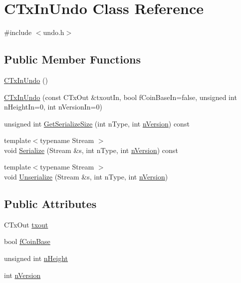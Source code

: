 \hypertarget{class_c_tx_in_undo}{}\section{C\+Tx\+In\+Undo Class Reference}
\label{class_c_tx_in_undo}


{\ttfamily \#include $<$undo.\+h$>$}

\subsection*{Public Member Functions}
\begin{DoxyCompactItemize}
\item 
\hyperlink{class_c_tx_in_undo_a9f8d4a16f1cb14fcec729becdb944003}{C\+Tx\+In\+Undo} ()
\item 
\hyperlink{class_c_tx_in_undo_a9f4da076d789bf5fa3f6d8d4b1d7d6fd}{C\+Tx\+In\+Undo} (const C\+Tx\+Out \&txout\+In, bool f\+Coin\+Base\+In=false, unsigned int n\+Height\+In=0, int n\+Version\+In=0)
\item 
unsigned int \hyperlink{class_c_tx_in_undo_a6f992d64f9d4ee6299cbd3305e4fd90f}{Get\+Serialize\+Size} (int n\+Type, int \hyperlink{class_c_tx_in_undo_a193281289475ca792e436a7a02de23ef}{n\+Version}) const 
\item 
{\footnotesize template$<$typename Stream $>$ }\\void \hyperlink{class_c_tx_in_undo_a37cebff3e836226b36e51d91e7cc2739}{Serialize} (Stream \&s, int n\+Type, int \hyperlink{class_c_tx_in_undo_a193281289475ca792e436a7a02de23ef}{n\+Version}) const 
\item 
{\footnotesize template$<$typename Stream $>$ }\\void \hyperlink{class_c_tx_in_undo_a0a2b82f03edad7ad85a66e63e4552af9}{Unserialize} (Stream \&s, int n\+Type, int \hyperlink{class_c_tx_in_undo_a193281289475ca792e436a7a02de23ef}{n\+Version})
\end{DoxyCompactItemize}
\subsection*{Public Attributes}
\begin{DoxyCompactItemize}
\item 
C\+Tx\+Out \hyperlink{class_c_tx_in_undo_a0eb1374984b5b68b0af14d88d7d4b821}{txout}
\item 
bool \hyperlink{class_c_tx_in_undo_a5952f917224de3a2193157b856c47864}{f\+Coin\+Base}
\item 
unsigned int \hyperlink{class_c_tx_in_undo_af022118f015a9b1b9ab96e04e8452292}{n\+Height}
\item 
int \hyperlink{class_c_tx_in_undo_a193281289475ca792e436a7a02de23ef}{n\+Version}
\end{DoxyCompactItemize}



